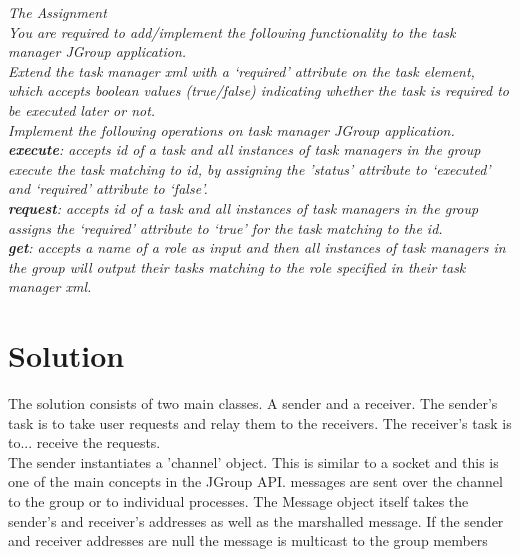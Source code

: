 \textit{The Assignment}\\

\textit{You are required to add/implement the following functionality to the task manager JGroup application.}\\

\textit{Extend the task manager xml with a ‘required’ attribute on the task element, which accepts boolean values (true/false) indicating whether the task is required to be executed later or not.}\\

\textit{Implement the following operations on task manager JGroup application.}\\

\textit{\textbf{execute}: accepts id of a task and all instances of task managers in the group execute the task matching to id, by assigning the ’status’ attribute to ‘executed’ and ‘required’ attribute to ‘false’.}\\

\textit{\textbf{request}: accepts id of a task and  all instances of task managers in the group assigns the ‘required’ attribute to ‘true’ for the task matching to the id.}\\

\textit{\textbf{get}: accepts a name of a role as input and then all instances of task managers in the group will output their tasks matching to the role specified in their task manager xml.}\\




\section{Solution}
\label{jgroup_solution}

The solution consists of two main classes. A sender and a receiver. The sender's task is to take user requests and relay them to the receivers.
The receiver's task is to... receive the requests. \\ 

The sender instantiates a 'channel' object. This is similar to a socket and this is one of the main concepts in the JGroup API. messages are sent 
over the channel to the group or to individual processes.  The Message object itself takes the sender's and receiver's addresses as well as the marshalled message. If the sender and receiver addresses are null the message is multicast to the group members\\

